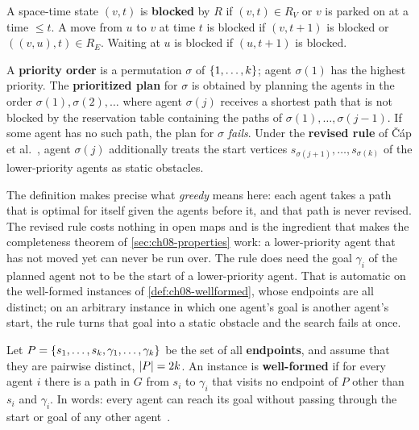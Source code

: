 A space-time state $(v, t)$ is \textbf{blocked}
by $R$ if $(v, t) \in R_V$ or $v$ is parked on at a time $\le t$. A move from $u$ to $v$
at time $t$ is blocked if $(v, t+1)$ is blocked or $((v, u), t) \in R_E$. Waiting at
$u$ is blocked if $(u, t+1)$ is blocked.

\begin{definition}
\label{def:ch08-order}
A \textbf{priority order} is a permutation $\sigma$ of
$\left\{ 1, \dots, k \right\}$; agent $\sigma(1)$ has the highest priority. The
\textbf{prioritized plan} for $\sigma$ is obtained by
planning the agents in the order $\sigma(1), \sigma(2), \dots$ where agent $\sigma(j)$
receives a shortest path that is not blocked by the reservation table containing the
paths of $\sigma(1), \dots, \sigma(j-1)$. If some agent has no such path, the plan for
$\sigma$ \emph{fails}. Under the \textbf{revised rule}
of \v{C}\'ap et al.~\cite{cap2015prioritized}, agent $\sigma(j)$ additionally treats
the start vertices $s_{\sigma(j+1)}, \dots, s_{\sigma(k)}$ of the lower-priority agents
as static obstacles.
\end{definition}

The definition makes precise what \emph{greedy} means here: each agent takes a path that
is optimal for itself given the agents before it, and that path is never revised. The
revised rule costs nothing in open maps and is the ingredient that makes the
completeness theorem of \cref{sec:ch08-properties} work: a lower-priority agent that
has not moved yet can never be run over. The rule does need the goal $\gamma_i$ of the
planned agent not to be the start of a lower-priority agent. That is automatic on the
well-formed instances of \cref{def:ch08-wellformed}, whose endpoints are all distinct;
on an arbitrary instance in which one agent's goal is another agent's start, the rule
turns that goal into a static obstacle and the search fails at once.

\begin{definition}
\label{def:ch08-wellformed}
Let $P = \left\{ s_1, \dots, s_k, \gamma_1, \dots, \gamma_k \right\}$ be the set of all
\textbf{endpoints}, and assume that they are pairwise distinct,
$\left\lvert P \right\rvert = 2k$. An instance is
\textbf{well-formed} if for every agent $i$ there is a path
in $G$ from $s_i$ to $\gamma_i$ that visits no endpoint of $P$ other than $s_i$ and $\gamma_i$. In
words: every agent can reach its goal without passing through the start or goal of any
other agent~\cite{cap2015prioritized}.
\end{definition}

